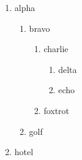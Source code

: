 \begin{enumerate}
   \item alpha
      \begin{enumerate}
         \item bravo
            \begin{enumerate}
               \item charlie
                  \begin{enumerate}
                     \item delta
                     \item echo
                  \end{enumerate}
               \item foxtrot
            \end{enumerate}
         \item golf
      \end{enumerate}
   \item hotel
\end{enumerate}